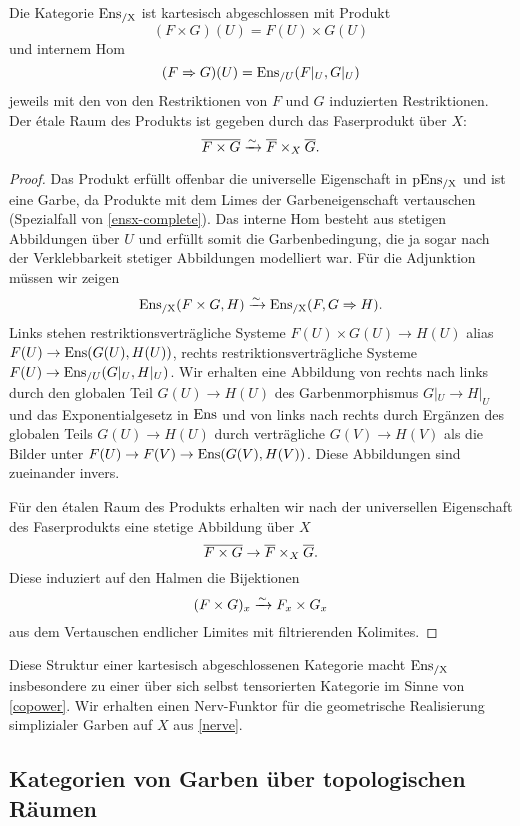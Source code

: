 \begin{prop} \label{ensx-cart-closed}
  Die Kategorie $\operatorname{Ens_{/X}}$ ist kartesisch abgeschlossen mit Produkt
  \[ (F \times G)(U) = F(U) \times G(U) \]
  und internem Hom
  \[ (F \Rightarrow G)(U) = \operatorname{Ens}_{/U}(F|_U, G|_U) \]
  jeweils mit den von den Restriktionen von $F$ und $G$ induzierten
  Restriktionen. Der étale Raum des Produkts ist gegeben durch das
  Faserprodukt über $X$:
  \[ \overline{F \times G}
     \xrightarrow[]{\sim} \overline{F} \times_X \overline{G}. \]
\end{prop}
\begin{proof}
  Das Produkt erfüllt offenbar die universelle Eigenschaft in $\operatorname{pEns_{/X}}$
  und ist eine Garbe, da Produkte mit dem Limes der Garbeneigenschaft
  vertauschen (Spezialfall von \ref{ensx-complete}). Das interne Hom
  besteht aus stetigen Abbildungen über $U$ und erfüllt somit die
  Garbenbedingung, die ja sogar nach der Verklebbarkeit stetiger
  Abbildungen modelliert war. Für die Adjunktion müssen wir zeigen
  \[ \operatorname{Ens_{/X}}(F \times G, H) \xrightarrow[]{\sim} \operatorname{Ens_{/X}}(F, G \Rightarrow H). \]
  Links stehen restriktionsverträgliche Systeme $F(U) \times G(U) \to
  H(U)$ alias $F(U) \to \operatorname{Ens}(G(U), H(U))$, rechts
  restriktionsverträgliche Systeme $F(U) \to \operatorname{Ens}_{/U}(G|_U,
  H|_U)$. Wir erhalten eine Abbildung von rechts nach links durch den
  globalen Teil $G(U) \to H(U)$ des Garbenmorphismus $G|_U \to H|_U$
  und das Exponentialgesetz in $\operatorname{Ens}$ und von links nach rechts durch
  Ergänzen des globalen Teils $G(U) \to H(U)$ durch verträgliche $G(V)
  \to H(V)$ als die Bilder unter $F(U) \to F(V) \to \operatorname{Ens}(G(V),
  H(V))$. Diese Abbildungen sind zueinander invers.

  Für den étalen Raum des Produkts erhalten wir nach der universellen
  Eigenschaft des Faserprodukts eine stetige Abbildung über $X$
  \[ \overline{F \times G}
  \to \overline{F} \times_X \overline{G}.
  \]
  Diese induziert auf den Halmen die Bijektionen
  \[ (F \times G)_x \xrightarrow[]{\sim} F_x \times G_x \]
  aus dem Vertauschen endlicher Limites mit filtrierenden Kolimites.
\end{proof}

Diese Struktur einer kartesisch abgeschlossenen Kategorie macht
$\operatorname{Ens_{/X}}$ insbesondere zu einer über sich selbst tensorierten Kategorie
im Sinne von \ref{copower}. Wir erhalten einen Nerv-Funktor für die
geometrische Realisierung simplizialer Garben auf $X$ aus \ref{nerve}.

\subsection{Kategorien von Garben über topologischen Räumen}

